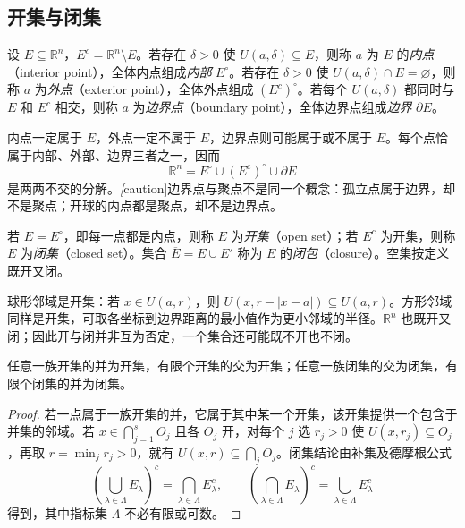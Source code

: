 \documentclass[UTF8,12pt,a4paper,fontset=fandol]{ctexbook}
\begin{document}
\subsection{开集与闭集}
\label{subsec:open-and-closed-sets}

\begin{definition}
\label{def:euclidean-interior-exterior-boundary}
设 $E\subseteq\mathbb R^n$，$E^c=\mathbb R^n\setminus E$。若存在 $\delta>0$ 使 $U(a,\delta)\subseteq E$，则称 $a$ 为 $E$ 的\emph{内点}（interior point），全体内点组成\emph{内部} $E^\circ$。若存在 $\delta>0$ 使 $U(a,\delta)\cap E=\varnothing$，则称 $a$ 为\emph{外点}（exterior point），全体外点组成 $(E^c)^\circ$。若每个 $U(a,\delta)$ 都同时与 $E$ 和 $E^c$ 相交，则称 $a$ 为\emph{边界点}（boundary point），全体边界点组成\emph{边界} $\partial E$。
\end{definition}

内点一定属于 $E$，外点一定不属于 $E$，边界点则可能属于或不属于 $E$。每个点恰属于内部、外部、边界三者之一，因而
\[
    \mathbb R^n=E^\circ\cup(E^c)^\circ\cup\partial E
\]
是两两不交的分解。\emph[caution]{边界点与聚点不是同一个概念}：孤立点属于边界，却不是聚点；开球的内点都是聚点，却不是边界点。

\begin{definition}
\label{def:euclidean-open-closed-closure}
若 $E=E^\circ$，即每一点都是内点，则称 $E$ 为\emph{开集}（open set）；若 $E^c$ 为开集，则称 $E$ 为\emph{闭集}（closed set）。集合 $\overline E=E\cup E'$ 称为 $E$ 的\emph{闭包}（closure）。空集按定义既开又闭。
\end{definition}

球形邻域是开集：若 $x\in U(a,r)$，则 $U(x,r-|x-a|)\subseteq U(a,r)$。方形邻域同样是开集，可取各坐标到边界距离的最小值作为更小邻域的半径。$\mathbb R^n$ 也既开又闭；因此开与闭并非互为否定，一个集合还可能既不开也不闭。

\begin{theorem}[开闭集的运算]
\label{thm:euclidean-open-closed-set-operations}
任意一族开集的并为开集，有限个开集的交为开集；任意一族闭集的交为闭集，有限个闭集的并为闭集。
\end{theorem}

\begin{proof}
若一点属于一族开集的并，它属于其中某一个开集，该开集提供一个包含于并集的邻域。若 $x\in\bigcap_{j=1}^s O_j$ 且各 $O_j$ 开，对每个 $j$ 选 $r_j>0$ 使 $U(x,r_j)\subseteq O_j$，再取 $r=\min_jr_j>0$，就有 $U(x,r)\subseteq\bigcap_jO_j$。闭集结论由补集及德摩根公式
\[
    \left(\bigcup_{\lambda\in\Lambda}E_\lambda\right)^c
       =\bigcap_{\lambda\in\Lambda}E_\lambda^c,\qquad
    \left(\bigcap_{\lambda\in\Lambda}E_\lambda\right)^c
       =\bigcup_{\lambda\in\Lambda}E_\lambda^c
\]
得到，其中指标集 $\Lambda$ 不必有限或可数。
\end{proof}
\end{document}
